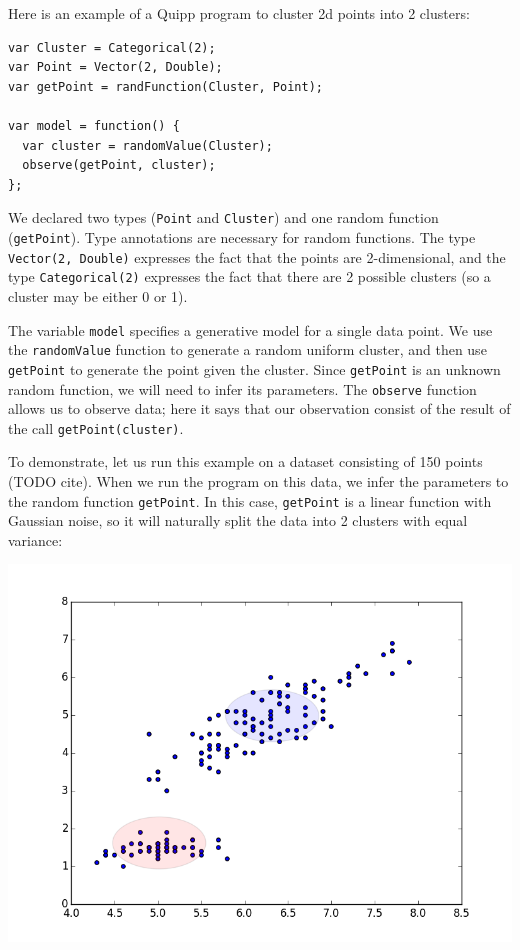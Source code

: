 \documentclass{article}
\begin{document}
  Here is an example of a Quipp program to cluster 2d points into 2 clusters:

  \begin{lstlisting}
var Cluster = Categorical(2);
var Point = Vector(2, Double);
var getPoint = randFunction(Cluster, Point);

var model = function() {
  var cluster = randomValue(Cluster);
  observe(getPoint, cluster);
};
  \end{lstlisting}

  We declared two types (\texttt{Point} and \texttt{Cluster}) and one
  random function (\texttt{getPoint}).  Type annotations are necessary for random
  functions.  The type \texttt{Vector(2, Double)} expresses the fact that the
  points are 2-dimensional, and the type \texttt{Categorical(2)} expresses the
  fact that there are 2 possible clusters (so a cluster may be either 0 or 1).

  The variable \texttt{model} specifies a generative model for a single data point.
  We use the \texttt{randomValue} function to generate a random uniform cluster, and then
  use \texttt{getPoint} to generate the point given the cluster.  Since \texttt{getPoint}
  is an unknown random function, we will need to infer its parameters.
  The \texttt{observe} function allows us to observe data; here it says that our
  observation consist of the result of the call \texttt{getPoint(cluster)}.

  To demonstrate, let us run this example on a dataset consisting of 150 points (TODO cite).  When we run the program on this data, we infer the parameters to the random function \texttt{getPoint}.
  In this case, \texttt{getPoint} is a linear function with Gaussian noise, so it will naturally
  split the data into 2 clusters with equal variance:
  \begin{center}
    \includegraphics[scale=0.5]{../plots/irisclusters_orig.png}
  \end{center}
\end{document}

